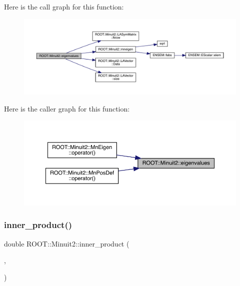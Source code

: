 Here is the call graph for this function\+:\nopagebreak
\begin{figure}[H]
\begin{center}
\leavevmode
\includegraphics[width=350pt]{d6/d3a/namespaceROOT_1_1Minuit2_a1569bf99d4c46944433c0b5bb02b3ad6_cgraph}
\end{center}
\end{figure}
Here is the caller graph for this function\+:\nopagebreak
\begin{figure}[H]
\begin{center}
\leavevmode
\includegraphics[width=350pt]{d6/d3a/namespaceROOT_1_1Minuit2_a1569bf99d4c46944433c0b5bb02b3ad6_icgraph}
\end{center}
\end{figure}
\mbox{\label{namespaceROOT_1_1Minuit2_ac47f2faa5fce723ec08365b174b5035d}} 
\subsubsection{\texorpdfstring{inner\_product()}{inner\_product()}}
{\footnotesize\ttfamily double R\+O\+O\+T\+::\+Minuit2\+::inner\+\_\+product (\begin{DoxyParamCaption}\item[{const \mbox{\hyperlink{classROOT_1_1Minuit2_1_1LAVector}{L\+A\+Vector}} \&}]{,  }\item[{const \mbox{\hyperlink{classROOT_1_1Minuit2_1_1LAVector}{L\+A\+Vector}} \&}]{ }\end{DoxyParamCaption})}

